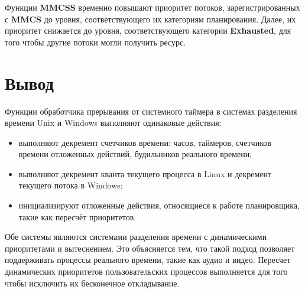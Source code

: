 Функции \textbf{MMCSS} временно повышают приоритет потоков, зарегистрированных с \textbf{MMCS} до уровня, соответствующего их категориям планирования. Далее, их приоритет снижается до уровня, соответствующего категории \textbf{Exhausted}, для того чтобы другие потоки могли получить ресурс.


\newpage
\section*{Вывод}

Функции обработчика прерывания от системного таймера в системах разделения времени Unix и Windows выполняют одинаковые действия:

\begin{itemize} 
	\item выполняют декремент счетчиков времени: часов, таймеров, счетчиков времени отложенных действий, будильников реального времени;
	\item выполняют декремент кванта текущего процесса в Linux и декремент текущего потока в Windows;
	\item инициализируют отложенные действия, относящиеся к работе планировщика, такие как пересчёт приоритетов.
\end{itemize} 

\noindent Обе системы являются системами разделения времени с динамическими приоритетами и вытеснением. Это объясняется тем, что такой подход позволяет поддерживать процессы реального времени, такие как аудио и видео. Пересчет динамических приоритетов пользовательских процессов выполняется для того чтобы исключить их бесконечное откладывание.


